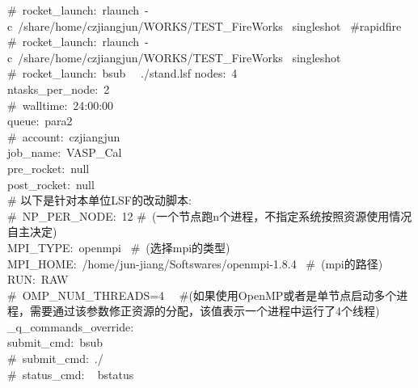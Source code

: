 \documentclass[10pt,a4paper]{article}
\begin{document}
\begin{itemize}
{{		\textrm{\#~rocket\_launch:~rlaunch~-c~/share/home/czjiangjun/WORKS/TEST\_FireWorks ~singleshot ~\#rapidfire}\\
		\textrm{\#~rocket\_launch:~rlaunch~-c~/share/home/czjiangjun/WORKS/TEST\_FireWorks ~singleshot}\\ 
		\textrm{\#~rocket\_launch:~bsub ~~./stand.lsf}
		\textrm{nodes:~4}\\
		\textrm{ntasks\_per\_node:~2}\\
		\textrm{\#~walltime:~24:00:00}\\
		\textrm{queue:~para2}\\
		\textrm{\#~account:~czjiangjun}\\
		\textrm{job\_name:~VASP\_Cal}\\
		\textrm{pre\_rocket:~null}\\
		\textrm{post\_rocket:~null}\\
		\# 以下是针对本单位\textrm{LSF}的改动脚本:\\
		\textrm{\#~NP\_PER\_NODE:~12 \#~(一个节点跑\textrm{n}个进程，不指定系统按照资源使用情况自主决定)}\\
		\textrm{MPI\_TYPE:~openmpi ~\#~(选择mpi的类型)}\\
		\textrm{MPI\_HOME:~/home/jun-jiang/Softswares/openmpi-1.8.4 ~\#~(\textrm{mpi}的路径)}\\
		\textrm{RUN:~RAW}\\
		\textrm{\#~OMP\_NUM\_THREADS=4 ~~\#(如果使用\textrm{OpenMP}或者是单节点启动多个进程，需要通过该参数修正资源的分配，该值表示一个进程中运行了4个线程)}\\
		\textrm{\_q\_commands\_override:}\\
		\hspace*{25pt}\textrm{submit\_cmd:~bsub}\\
		\hspace*{25pt}\#~\textrm{submit\_cmd:~./}\\
		\hspace*{25pt}\#~\textrm{status\_cmd: ~ bstatus}
	}}
\end{itemize}
\end{document}
